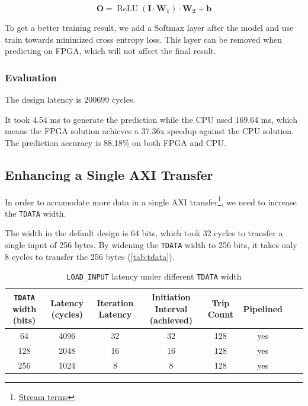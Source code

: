 \[
    \mathbf{O} = \operatorname{ReLU}(\mathbf{I} \cdot \mathbf{W_1}) \cdot \mathbf{W_2} + \mathbf{b}
\]

To get a better training result, we add a Softmax layer after the model and use train towards minimized cross entropy loss.
This layer can be removed when predicting on FPGA, which will not affect the final result.


\subsubsection{Evaluation}

The design latency is 200699 cycles.

It took 4.54 ms to generate the prediction while the CPU used 169.64 ms, which means the FPGA solution achieves a 37.36x speedup against the CPU solution.
The prediction accuracy is 88.18\% on both FPGA and CPU.



\subsection{Enhancing a Single AXI Transfer}

In order to accomodate more data in a single AXI transfer\footnote{
    \href{https://developer.arm.com/documentation/ihi0051/a/Introduction/About-the-AXI4-Stream-protocol/Stream-terms}{Stream terms}
}, we need to increase the \texttt{TDATA} width.

The width in the default design is 64 bits, which took 32 cycles to transfer a single input of 256 bytes.
By widening the \texttt{TDATA} width to 256 bits, it takes only 8 cycles to transfer the 256 bytes (\autoref{tab:tdata}).

\begin{table}[ht!]
    \centering
    \caption{\texttt{LOAD\_INPUT} latency under different \texttt{TDATA} width}
    \label{tab:tdata}
    \begin{tabular}{cccccccc}
        \toprule
        \texttt{TDATA} width (bits) & Latency (cycles) & Iteration Latency & Initiation Interval (achieved) & Trip Count & Pipelined \\
        \midrule
        64                          & 4096             & 32                & 32                             & 128        & yes       \\
        128                         & 2048             & 16                & 16                             & 128        & yes       \\
        256                         & 1024             & 8                 & 8                              & 128        & yes       \\
        \bottomrule
    \end{tabular}
\end{table}


